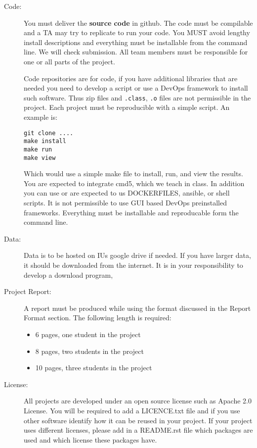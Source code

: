 \begin{description}
\item[Code:]
You must deliver the \textbf{source code} in github. The code must be
compilable and a TA may try to replicate to run your code. You MUST
avoid lengthy install descriptions and everything must be installable
from the command line. We will check submission. All team members must
be responsible for one or all parts of the project.

Code repositories are for code, if you have additional libraries that
are needed you need to develop a script or use a DevOps framework to
install such software. Thus zip files and \verb|.class|, \verb|.o| files are not
permissible in the project. Each project must be reproducible with a
simple script. An example is:

\begin{verbatim}
git clone ....
make install
make run
make view
\end{verbatim}

Which would use a simple make file to install, run, and view the
results.  You are expected to integrate cmd5, which we teach in
class. In addition you can use or are expected to us DOCKERFILES,
ansible, or shell scripts. It is not permissible to use GUI based
DevOps preinstalled frameworks. Everything must be installable and
reproducable form the command line.

\item[Data:] Data is to be hosted on IUs google drive if needed. If
  you have larger data, it should be downloaded from the internet. It
  is in your responsibility to develop a download program,
\item[Project Report:] A report must be produced while using the
  format discussed in the Report Format section. The following length
  is required:

\begin{itemize}
\item
  6 pages, one student in the project
\item
  8 pages, two students in the project
\item
  10 pages, three students in the project
\end{itemize}

\item[License:] All projects are developed under an open source
  license such as Apache 2.0 License. You will be required to add a
  LICENCE.txt file and if you use other software identify how it can
  be reused in your project. If your project uses different licenses,
  please add in a README.rst file which packages are used and which
  license these packages have.
\end{description}

